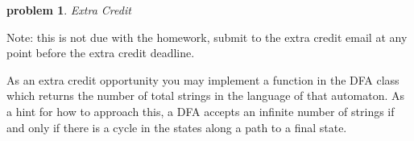 \documentclass[10pt]{article}
\newtheorem{problem}{\sc\color{cit}problem}
\begin{document}
\begin{problem} Extra Credit \end{problem}
Note: this is not due with the homework, submit to the extra credit email at any point before the extra credit deadline.

As an extra credit opportunity you may implement a function in the DFA class which returns the number of total strings in the language of that automaton. As a hint for how to approach this, a DFA accepts an infinite number of strings if and only if there is a cycle in the states along a path to a final state.
\end{document}
